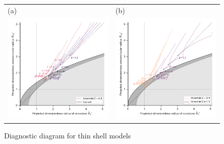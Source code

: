\begin{figure}
  \centering
  \begin{tabular}{@{}ll@{}}
    (a) & (b) \\
    \includegraphics{figs/ancantoid-R90-vs-Rc-a}
        & \includegraphics{figs/ancantoid-R90-vs-Rc-b} \\
  \end{tabular}
  \caption{Diagnostic diagram for thin shell models}
  \label{fig:thin-shell-R90-Rc}
\end{figure}

